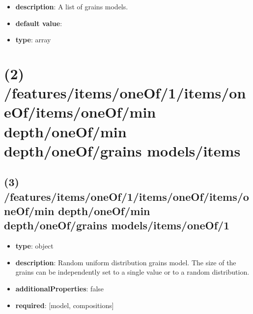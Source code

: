 \begin{itemize}[leftmargin=1em]\item {\bf description}: A list of grains models.
\item {\bf default value}: 
\item {\bf type}: array
\end{itemize}\section{(2) /features/items/oneOf/1/items/oneOf/items/oneOf/min depth/oneOf/min depth/oneOf/grains models/items}

\subsection{(3) /features/items/oneOf/1/items/oneOf/items/oneOf/min depth/oneOf/min depth/oneOf/grains models/items/oneOf/1}
\begin{itemize}[leftmargin=3em]\item {\bf type}: object
\item {\bf description}: Random uniform distribution grains model. The size of the grains can be independently set to a single value or to a random distribution.
\item {\bf additionalProperties}: false
\item {\bf required}: [model, compositions]\end{itemize}
